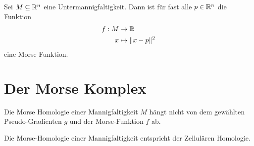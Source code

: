\documentclass[a4paper,11pt]{article}
\begin{document}
\begin{theorem}

\end{theorem}

\begin{theorem}
    Sei $M \subseteq { \mathbb R }^n$ eine Untermannigfaltigkeit. Dann ist für fast alle
    $p \in { \mathbb R }^n$ die Funktion
    \begin{align*}
        f: M &\to { \mathbb R } \\
        x &\mapsto \lVert x - p \rVert^2
    \end{align*}
    eine Morse-Funktion.
\end{theorem}

\section{Der Morse Komplex}

\begin{definition}

\end{definition}

\begin{definition}

\end{definition}

\begin{definition}

\end{definition}

\begin{lemma}
    Die Morse Homologie einer Mannigfaltigkeit $M$ hängt nicht von dem gewählten
    Pseudo-Gradienten $g$ und der Morse-Funktion $f$ ab.
\end{lemma}

\begin{theorem}
    Die Morse-Homologie einer Mannigfaltigkeit entspricht der Zellulären 
    Homologie.
\end{theorem}
\end{document}
